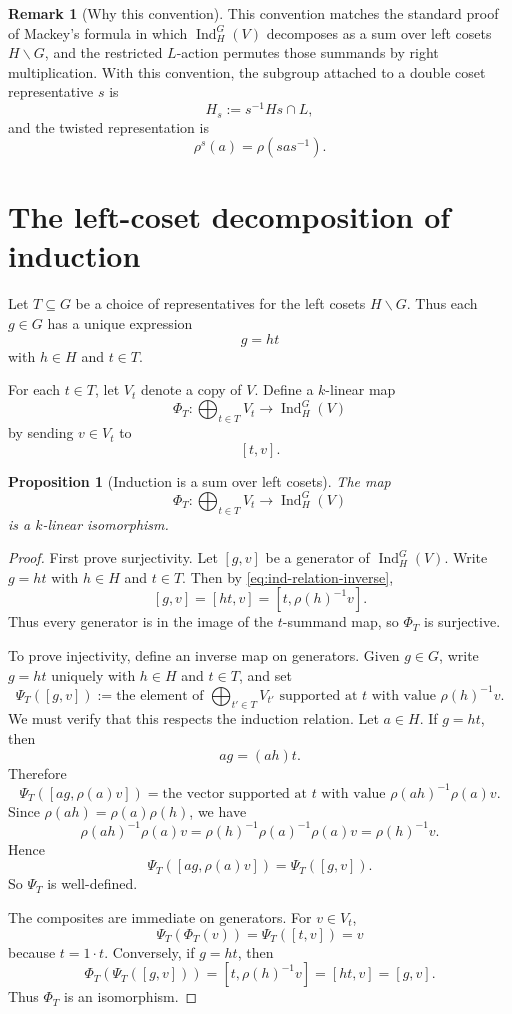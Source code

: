 \documentclass[11pt]{article}
\newtheorem{proposition}[theorem]{Proposition}
\theoremstyle{definition}
\newtheorem{remark}[theorem]{Remark}
\newcommand{\Ind}{\operatorname{Ind}}
\begin{document}
\begin{remark}[Why this convention]
This convention matches the standard proof of Mackey's formula in which $\Ind_H^G(V)$ decomposes as a sum over left cosets $H\backslash G$, and the restricted $L$-action permutes those summands by right multiplication. With this convention, the subgroup attached to a double coset representative $s$ is
\[
  H_s := s^{-1}Hs\cap L,
\]
and the twisted representation is
\[
  \rho^s(a)=\rho(sas^{-1}).
\]
\end{remark}

\section{The left-coset decomposition of induction}

Let $T\subseteq G$ be a choice of representatives for the left cosets $H\backslash G$. Thus each $g\in G$ has a unique expression
\[
  g=ht
\]
with $h\in H$ and $t\in T$.

For each $t\in T$, let $V_t$ denote a copy of $V$. Define a $k$-linear map
\[
  \Phi_T : \bigoplus_{t\in T} V_t \longrightarrow \Ind_H^G(V)
\]
by sending $v\in V_t$ to
\[
  [t,v].
\]

\begin{proposition}[Induction is a sum over left cosets]\label{prop:left-coset-decomp}
The map
\[
  \Phi_T : \bigoplus_{t\in T} V_t \longrightarrow \Ind_H^G(V)
\]
is a $k$-linear isomorphism.
\end{proposition}

\begin{proof}
First prove surjectivity. Let $[g,v]$ be a generator of $\Ind_H^G(V)$. Write $g=ht$ with $h\in H$ and $t\in T$. Then by \eqref{eq:ind-relation-inverse},
\[
  [g,v]=[ht,v]=[t,\rho(h)^{-1}v].
\]
Thus every generator is in the image of the $t$-summand map, so $\Phi_T$ is surjective.

To prove injectivity, define an inverse map on generators. Given $g\in G$, write $g=ht$ uniquely with $h\in H$ and $t\in T$, and set
\[
  \Psi_T([g,v])
  :=
  \text{the element of }\bigoplus_{t'\in T}V_{t'}
  \text{ supported at }t\text{ with value }\rho(h)^{-1}v.
\]
We must verify that this respects the induction relation. Let $a\in H$. If $g=ht$, then
\[
  ag=(ah)t.
\]
Therefore
\[
  \Psi_T([ag,\rho(a)v])
  =
  \text{the vector supported at }t\text{ with value }\rho(ah)^{-1}\rho(a)v.
\]
Since $\rho(ah)=\rho(a)\rho(h)$, we have
\[
  \rho(ah)^{-1}\rho(a)v
  =
  \rho(h)^{-1}\rho(a)^{-1}\rho(a)v
  =
  \rho(h)^{-1}v.
\]
Hence
\[
  \Psi_T([ag,\rho(a)v])=\Psi_T([g,v]).
\]
So $\Psi_T$ is well-defined.

The composites are immediate on generators. For $v\in V_t$,
\[
  \Psi_T(\Phi_T(v))=\Psi_T([t,v])=v
\]
because $t=1\cdot t$. Conversely, if $g=ht$, then
\[
  \Phi_T(\Psi_T([g,v]))
  =
  [t,\rho(h)^{-1}v]
  =
  [ht,v]
  =
  [g,v].
\]
Thus $\Phi_T$ is an isomorphism.
\end{proof}
\end{document}
